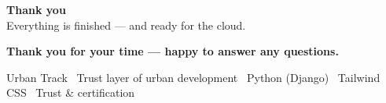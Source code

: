 \documentclass[aspectratio=169, 10pt]{beamer}
\begin{document}
{
\begin{frame}[plain]
  \centering
  \vspace*{0.8cm}
  {\color{white}\Huge\bfseries Thank you}\\[14pt]
  {\color{utamber}\Large Everything is finished --- and ready for the cloud.}\\[18pt]
  \begin{tcolorbox}[enhanced, colback=utteal, colframe=utteal,
    boxrule=0pt, arc=4pt, width=0.6\textwidth, center, boxsep=10pt]
    \color{white}\small\bfseries Thank you for your time --- happy to answer any questions.
  \end{tcolorbox}
  \vspace{0.35cm}
  {\color{utlight}\footnotesize Urban Track \textbullet\ Trust layer of urban development \textbullet\ Python (Django) \textbullet\ Tailwind CSS \textbullet\ Trust \& certification}
\end{frame}
}
\end{document}
